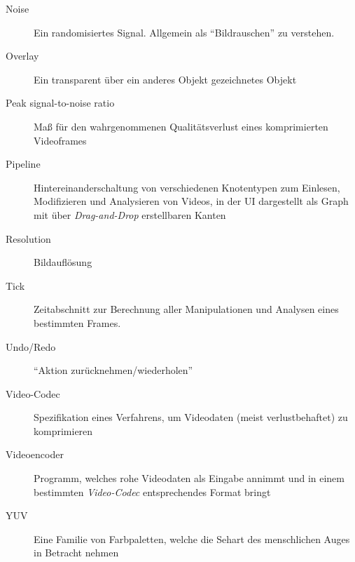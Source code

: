 \begin{description}
    \item[Noise] Ein randomisiertes Signal. Allgemein als ``Bildrauschen'' zu verstehen.

    \item[Overlay] Ein transparent über ein anderes Objekt gezeichnetes Objekt
    \item[Peak signal-to-noise ratio] Maß für den wahrgenommenen Qualitätsverlust eines komprimierten Videoframes
    \item[Pipeline] Hintereinanderschaltung von verschiedenen Knotentypen zum Einlesen, Modifizieren und Analysieren von Videos, in der UI dargestellt als Graph mit über \emph{Drag-and-Drop} erstellbaren Kanten

    \item[Resolution] Bildauflösung

    \item[Tick] Zeitabschnitt zur Berechnung aller Manipulationen und Analysen eines bestimmten Frames.

    \item[Undo/Redo] ``Aktion zurücknehmen/wiederholen''

    \item[Video-Codec] Spezifikation eines Verfahrens, um Videodaten (meist verlustbehaftet) zu komprimieren
    \item[Videoencoder] Programm, welches rohe Videodaten als Eingabe annimmt und in einem bestimmten \emph{Video-Codec} entsprechendes Format bringt

    \item[YUV] Eine Familie von Farbpaletten, welche die Sehart des menschlichen Auges in Betracht nehmen
\end{description}
